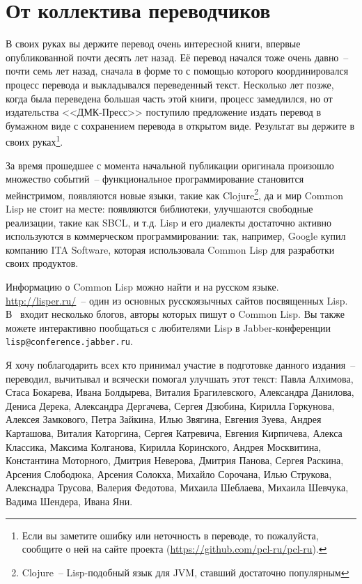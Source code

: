 \chapter*{От коллектива переводчиков}

В своих руках вы держите перевод очень интересной книги, впервые опубликованной почти
десять лет назад.  Её перевод начался тоже очень давно~-- почти семь лет назад, сначала в
форме то с помощью которого координировался процесс перевода и выкладывался переведенный
текст.  Несколько лет позже, когда была переведена большая часть этой книги, процесс
замедлился, но от издательства <<ДМК-Пресс>> поступило предложение издать перевод в
бумажном виде с сохранением перевода в открытом виде.  Результат вы держите в своих
руках\footnote{Если вы заметите ошибку или неточность в переводе, то пожалуйста, сообщите
  о ней на сайте проекта (\url{https://github.com/pcl-ru/pcl-ru}).}\hspace{\footnotenegspace}.

За время прошедшее с момента начальной публикации оригинала произошло множество событий~--
функциональное программирование становится мейнстримом, появляются новые языки, такие как
Clojure\footnote{Clojure~-- Lisp-подобный язык для JVM, ставший достаточно популярным}, да
и мир Common Lisp не стоит на месте: появляются библиотеки, улучшаются свободные
реализации, такие как SBCL, и т.д.  Lisp и его диалекты достаточно активно используются в
коммерческом программировании: так, например, Google купил компанию ITA Software, которая
использовала Common Lisp для разработки своих продуктов.

Информацию о Common Lisp можно найти и на русском языке.
\mbox{\url{http://lisper.ru/}}~-- один из основных русскоязычных сайтов посвященных Lisp.
В~
входит несколько блогов, авторы которых пишут о Common Lisp.  Вы также можете интерактивно
пообщаться с любителями Lisp в Jabber-конференции \verb|lisp@conference.jabber.ru|.

Я хочу поблагодарить всех кто принимал участие в подготовке данного издания~-- переводил,
вычитывал и всячески помогал улучшать этот текст: Павла Алхимова, Стаса Бокарева, Ивана
Болдырева, Виталия Брагилевского, Александра Данилова, Дениса Дерека, Александра
Дергачева, Сергея Дзюбина, Кирилла Горкунова, Алексея Замкового, Петра Зайкина, Илью
Звягина, Евгения Зуева, Андрея Карташова, Виталия Каторгина, Сергея Катревича, Евгения
Кирпичева, Алекса Классика, Максима Колганова, Кирилла Коринского, Андрея Москвитина,
Константина Моторного, Дмитрия Неверова, Дмитрия Панова, Сергея Раскина, Арсения
Слободюка, Арсения Солокха, Михайло Сорочана, Илью Струкова, Алекснадра Трусова, Валерия
Федотова, Михаила Шеблаева, Михаила Шевчука, Вадима Шендера, Ивана Яни.

